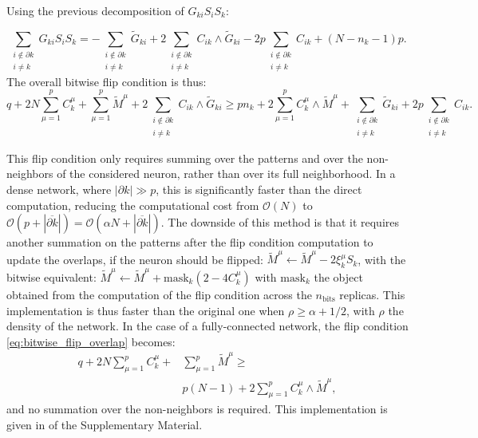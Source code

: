 Using the previous decomposition of $G_{ki} S_i S_k$:
\begin{widetext}
\begin{equation*}
    \sum_{\substack{i \notin \partial k \\ i \neq k}} G_{ki} S_i S_k= -
    \sum_{\substack{i \notin \partial k \\ i \neq k}} \tilde{G}_{ki} +
  2 \sum_{\substack{i \notin \partial k \\ i \neq k}} C_{ik} \wedge \tilde{G}_{ki} - 2p
    \sum_{\substack{i \notin \partial k \\ i \neq k}} C_{ik}
    +(N-n_k-1)p.
\end{equation*}
The overall bitwise flip condition is thus:
\begin{equation}
   q+ 2N \sum_{\mu=1}^p C_k^\mu +  \sum_{\mu=1}^p \tilde{M}^\mu +   2 \sum_{\substack{i \notin \partial k \\ i \neq k}} C_{ik} \wedge \tilde{G}_{ki} \geq  p n_k + 2 \sum_{\mu=1}^p C_k^\mu \wedge \tilde{M}^\mu +\sum_{\substack{i \notin \partial k \\ i \neq k}} \tilde{G}_{ki} + 2p \sum_{\substack{i \notin \partial k \\ i \neq k}} C_{ik}.
    \label{eq:bitwise_flip_overlap}
\end{equation}
\end{widetext}
This flip condition only requires summing over the patterns and over the non-neighbors of the considered neuron, rather than over its full neighborhood.
In a dense network, where $|\partial k| \gg p$, this is significantly faster than the direct computation, reducing the computational cost from $\mathcal{O}(N)$ to $\mathcal{O}(p+ |\overline{\partial k} |)=\mathcal{O}(\alpha N+ |\overline{\partial k} |)$. The downside of this method is that it requires another summation on the patterns after the flip condition computation to update the overlaps, if the neuron should be flipped: $\tilde{M}^\mu \leftarrow \tilde{M}^\mu - 2 \xi_k^\mu S_k$, with the bitwise equivalent: $\tilde{M}^\mu \leftarrow \tilde{M}^\mu + \text{mask}_k (2-4C_k^\mu)$ with $\text{mask}_k$ the \Bits object obtained from the computation of the flip condition across the $n_\text{bits}$ replicas. This implementation is thus faster than the original one when $\rho \geq \alpha + 1/2$, with $\rho$ the density of the network.
In the case of a fully-connected network, the flip condition \eqref{eq:bitwise_flip_overlap} becomes:
\begin{equation}
\begin{aligned}
   q+ 2N \sum_{\mu=1}^p C_k^\mu +  &\sum_{\mu=1}^p \tilde{M}^\mu \geq \\ & p (N-1) + 2 \sum_{\mu=1}^p C_k^\mu \wedge \tilde{M}^\mu,
    \label{eq:bitwise_flip_overlap_FC}
\end{aligned}
\end{equation}
and no summation over the non-neighbors is required. This implementation is given in  of the Supplementary Material.


